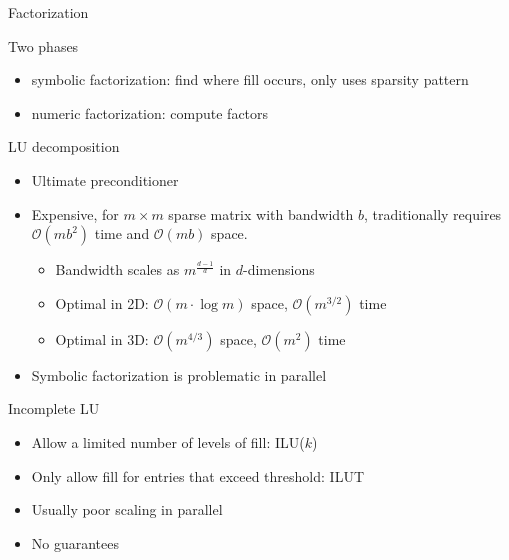 \begin{frame}[shrink=5]{Factorization}
  \begin{block}{Two phases}
  \begin{itemize}
  \item symbolic factorization: find where fill occurs, only uses sparsity pattern
  \item numeric factorization: compute factors
  \end{itemize}
  \end{block}
  
  \begin{block}{LU decomposition}
    \begin{itemize}
    \item Ultimate preconditioner
    \item Expensive, for $m\times m$ sparse matrix with bandwidth $b$, traditionally requires $\mathcal{O}(mb^2)$ time and $\mathcal{O}(mb)$ space.
      \begin{itemize}
      \item Bandwidth scales as $m^{\frac{d-1}{d}}$ in $d$-dimensions
      \item Optimal in 2D: $\mathcal{O}(m \cdot \log m)$ space, $\mathcal{O}(m^{3/2})$ time
      \item Optimal in 3D: $\mathcal{O}(m^{4/3})$ space, $\mathcal{O}(m^2)$ time
      \end{itemize}
    \item Symbolic factorization is problematic in parallel
    \end{itemize}
  \end{block}
  
  \begin{block}{Incomplete LU}
    \begin{itemize}
    \item Allow a limited number of levels of fill:
      ILU($k$)
    \item Only allow fill for entries that exceed threshold: ILUT
    \item Usually poor scaling in parallel
    \item No guarantees
    \end{itemize}
  \end{block}
\end{frame}

